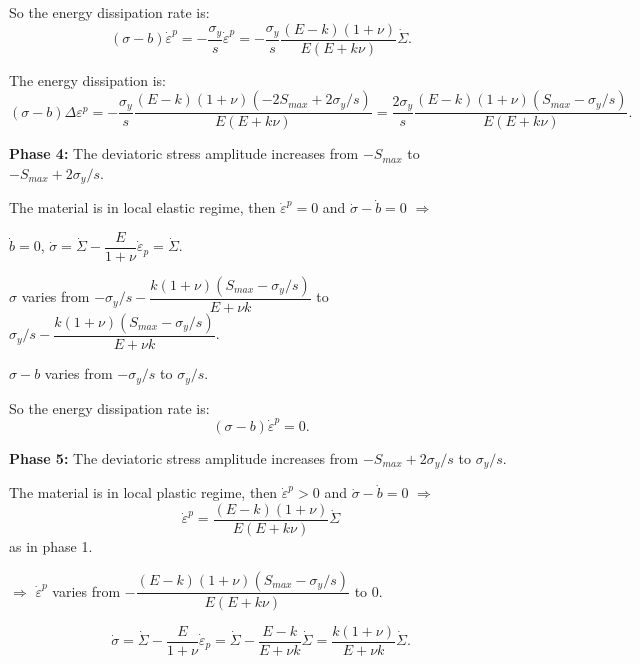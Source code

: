 \vspace{6pt}
\noindent
So the energy dissipation rate is: $$(\sigma-b)\dot{\varepsilon}^p=-\dfrac{\sigma_y}{s}\dot{\varepsilon}^p=-\dfrac{\sigma_y}{s}\dfrac{(E- k)(1+\nu)}{E(E+k\nu)}\dot{\Sigma}.$$

\noindent
The energy dissipation is: $$(\sigma-b)\Delta\varepsilon^p=-\dfrac{\sigma_y}{s}\dfrac{(E- k)(1+\nu)(-2S_{max}+2\sigma_y/s)}{E(E+k\nu)}=\dfrac{2\sigma_y}{s}\dfrac{(E- k)(1+\nu)(S_{max}-\sigma_y/s)}{E(E+k\nu)}.$$



\vspace{6pt}
\noindent
\textbf{Phase 4:} The deviatoric stress amplitude increases from $-S_{max}$ to $-S_{max}+2\sigma_y/s$.

\noindent
The material is in local elastic regime, then $\dot{\varepsilon}^p=0$ and $\dot{\sigma}-\dot{b}=0$ $\Rightarrow$

\vspace{6pt}
\noindent
$\dot{b}=0$, $\dot{\sigma}=\dot{\Sigma}-\dfrac{E}{1+\nu}\dot{\varepsilon}_p=\dot{\Sigma}$.

\vspace{6pt}
\noindent
$\sigma$ varies from $-\sigma_y/s-\dfrac{k(1+\nu)(S_{max}-\sigma_y/s)}{E+\nu k}$ to $\sigma_y/s-\dfrac{k(1+\nu)(S_{max}-\sigma_y/s)}{E+\nu k}$.

\vspace{6pt}
\noindent
$\sigma-b$ varies from $-\sigma_y/s$ to $\sigma_y/s$.

\vspace{6pt}
\noindent
So the energy dissipation rate is: $$(\sigma-b)\dot{\varepsilon}^p=0.$$


\vspace{6pt}
\noindent
\textbf{Phase 5:} The deviatoric stress amplitude increases from $-S_{max}+2\sigma_y/s$ to $\sigma_y/s$.

\noindent
The material is in local plastic regime, then $\dot{\varepsilon}^p>0$ and $\dot{\sigma}-\dot{b}=0$ $\Rightarrow$ 
$$\dot{\varepsilon}^p=\dfrac{(E- k)(1+\nu)}{E(E+k\nu)}\dot{\Sigma}$$ as in phase 1.

\vspace{6pt}
\noindent
$\Rightarrow$ $\dot{\varepsilon}^p$ varies from $-\dfrac{(E- k)(1+\nu)(S_{max}-\sigma_y/s)}{E(E+k\nu)}$ to $0$.

\vspace{6pt}
$$\dot{\sigma}=\dot{\Sigma}-\dfrac{E}{1+\nu}\dot{\varepsilon}_p=\dot{\Sigma}-\dfrac{E-k}{E+\nu k}\dot{\Sigma}=\dfrac{k(1+\nu)}{E+\nu k}\dot{\Sigma}.$$

